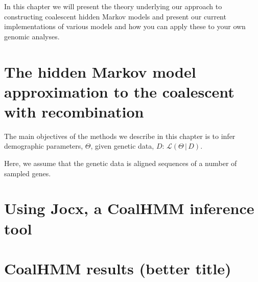 \documentclass[graybox]{svmult}
\renewcommand{\lhd}{\ensuremath{\mathcal{L}}}
\begin{document}
In this chapter we will present the theory underlying our approach to constructing coalescent hidden Markov models and present our current implementations of various models and how you can apply these to your own genomic analyses.

\section{The hidden Markov model approximation to the coalescent with recombination}

The main objectives of the methods we describe in this chapter is to infer demographic parameters, $\Theta$, given genetic data, $D$: $\lhd(\Theta\,|\,D)$. 


Here, we assume that the genetic data is aligned sequences of a number of sampled genes.




\section{Using Jocx, a CoalHMM inference tool}

\section{CoalHMM results (better title)}




\end{document}
